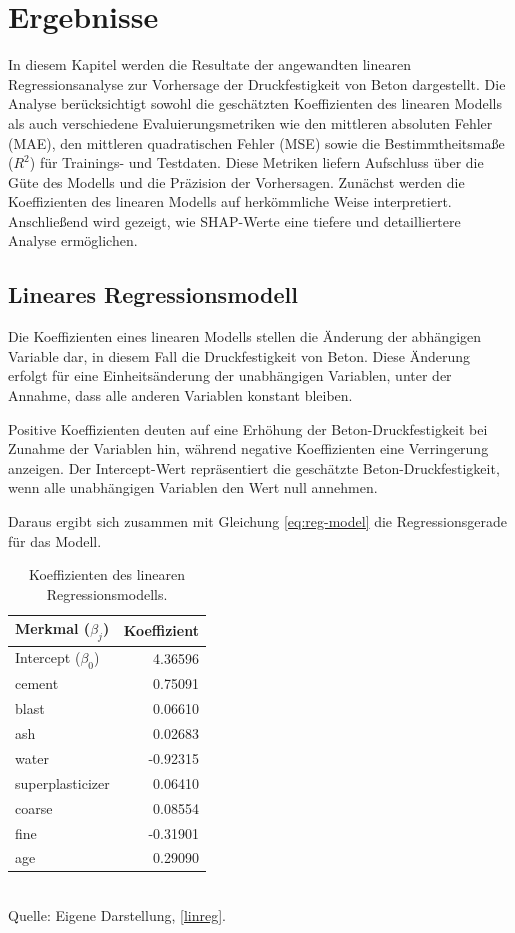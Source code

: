 \chapter{Ergebnisse}
\label{chapter:results}

In diesem Kapitel werden die Resultate der angewandten linearen Regressionsanalyse 
zur Vorhersage der Druckfestigkeit von Beton dargestellt. 
Die Analyse berücksichtigt sowohl die geschätzten Koeffizienten des linearen Modells 
als auch verschiedene Evaluierungsmetriken wie den mittleren absoluten Fehler (MAE), 
den mittleren quadratischen Fehler (MSE) sowie die Bestimmtheitsmaße ($R^2$) 
für Trainings- und Testdaten. Diese Metriken liefern Aufschluss über die Güte des Modells 
und die Präzision der Vorhersagen. Zunächst werden die Koeffizienten 
des linearen Modells auf herkömmliche Weise interpretiert. Anschließend wird gezeigt, 
wie SHAP-Werte eine tiefere und detailliertere Analyse ermöglichen.

\section{Lineares Regressionsmodell}

Die Koeffizienten eines linearen Modells stellen die Änderung der abhängigen Variable dar, 
in diesem Fall die Druckfestigkeit von Beton. Diese Änderung erfolgt für eine Einheitsänderung der 
unabhängigen Variablen, unter der Annahme, dass alle anderen Variablen konstant bleiben.

Positive Koeffizienten deuten auf eine Erhöhung der Beton-Druckfestigkeit 
bei Zunahme der Variablen hin, während negative Koeffizienten eine Verringerung anzeigen. 
Der Intercept-Wert repräsentiert die geschätzte Beton-Druckfestigkeit, 
wenn alle unabhängigen Variablen den Wert null annehmen. 

Daraus ergibt sich zusammen mit Gleichung \ref{eq:reg-model} die Regressionsgerade für das Modell.

\begin{table}[!h]
    \caption{Koeffizienten des linearen Regressionsmodells.}
    \begin{tabularx}{\textwidth}{Xr}
    \toprule
    Merkmal ($\beta_j$) & Koeffizient \\
    \midrule
    Intercept ($\beta_0$) & 4.36596 \\
    cement & 0.75091 \\
    blast & 0.06610 \\
    ash & 0.02683 \\
    water & -0.92315 \\
    superplasticizer & 0.06410 \\
    coarse & 0.08554 \\
    fine &  -0.31901 \\
    age & 0.29090 \\
    \bottomrule
    \end{tabularx}
    \label{tab:model-coefficients}
    \\ Quelle: Eigene Darstellung, \ref{linreg}.
\end{table}

